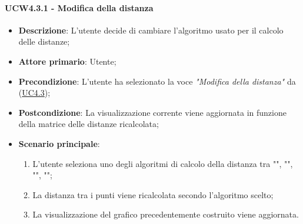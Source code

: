 \paragraph{UCW4.3.1 - Modifica della distanza}
\label{par:ucw4.3.1}
\begin{itemize}
    \item \textbf{Descrizione}: L’utente decide di cambiare l’algoritmo usato per il calcolo delle distanze;

    \item \textbf{Attore primario}: Utente;

    \item \textbf{Precondizione}:   L'utente ha selezionato la voce \emph{"Modifica della distanza"} da (\hyperref[ssub:uc4.3]{UC4.3});
    \item \textbf{Postcondizione}:  La visualizzazione corrente viene aggiornata in funzione della matrice delle distanze ricalcolata;

	\item \textbf{Scenario principale}:
        \begin{enumerate}
            \item L'utente seleziona uno degli algoritmi di calcolo della distanza tra "", 
            "", "", "";
            \item La distanza tra i punti viene ricalcolata secondo l'algoritmo scelto;
            \item La visualizzazione del grafico precedentemente costruito viene aggiornata.
        \end{enumerate}
\end{itemize}

